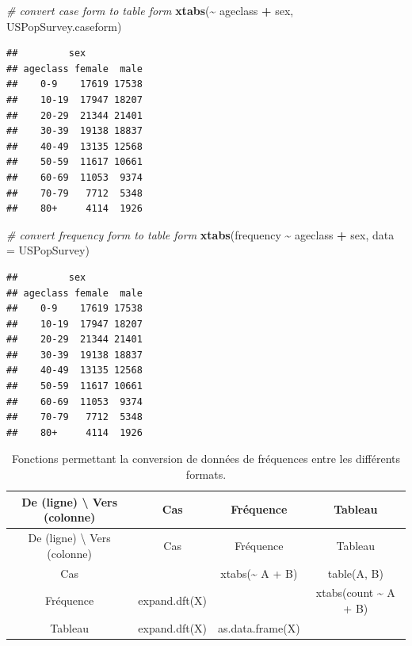 \documentclass[
  12pt,
]{book}
\newenvironment{Shaded}{\begin{snugshade}}{\end{snugshade}}
\newcommand{\CommentTok}[1]{\textcolor[rgb]{0.56,0.35,0.01}{\textit{#1}}}
\newcommand{\DataTypeTok}[1]{\textcolor[rgb]{0.13,0.29,0.53}{#1}}
\newcommand{\KeywordTok}[1]{\textcolor[rgb]{0.13,0.29,0.53}{\textbf{#1}}}
\newcommand{\NormalTok}[1]{#1}
\newcommand{\OperatorTok}[1]{\textcolor[rgb]{0.81,0.36,0.00}{\textbf{#1}}}
\newcommand{\StringTok}[1]{\textcolor[rgb]{0.31,0.60,0.02}{#1}}
\begin{document}
\begin{Shaded}
\begin{Highlighting}[]
\CommentTok{\# convert case form to table form}
\KeywordTok{xtabs}\NormalTok{(}\OperatorTok{\textasciitilde{}}\StringTok{ }\NormalTok{ageclass }\OperatorTok{+}\StringTok{ }\NormalTok{sex, USPopSurvey.caseform)}
\end{Highlighting}
\end{Shaded}

\begin{verbatim}
##         sex
## ageclass female  male
##    0-9    17619 17538
##    10-19  17947 18207
##    20-29  21344 21401
##    30-39  19138 18837
##    40-49  13135 12568
##    50-59  11617 10661
##    60-69  11053  9374
##    70-79   7712  5348
##    80+     4114  1926
\end{verbatim}

\begin{Shaded}
\begin{Highlighting}[]
\CommentTok{\# convert frequency form to table form}
\KeywordTok{xtabs}\NormalTok{(frequency }\OperatorTok{\textasciitilde{}}\StringTok{ }\NormalTok{ageclass }\OperatorTok{+}\StringTok{ }\NormalTok{sex, }\DataTypeTok{data =}\NormalTok{ USPopSurvey)}
\end{Highlighting}
\end{Shaded}

\begin{verbatim}
##         sex
## ageclass female  male
##    0-9    17619 17538
##    10-19  17947 18207
##    20-29  21344 21401
##    30-39  19138 18837
##    40-49  13135 12568
##    50-59  11617 10661
##    60-69  11053  9374
##    70-79   7712  5348
##    80+     4114  1926
\end{verbatim}

\begin{longtable}[]{@{}cccc@{}}
\caption{\label{tab:unnamed-chunk-1}Fonctions permettant la conversion de données de fréquences entre les différents formats.}\tabularnewline
\toprule
De (ligne) \textbackslash{} Vers (colonne) & Cas & Fréquence & Tableau\tabularnewline
\midrule
\endfirsthead
\toprule
De (ligne) \textbackslash{} Vers (colonne) & Cas & Fréquence & Tableau\tabularnewline
\midrule
\endhead
Cas & & xtabs(\textasciitilde{} A + B) & table(A, B)\tabularnewline
Fréquence & expand.dft(X) & & xtabs(count \textasciitilde{} A + B)\tabularnewline
Tableau & expand.dft(X) & as.data.frame(X) &\tabularnewline
\bottomrule
\end{longtable}
\end{document}
